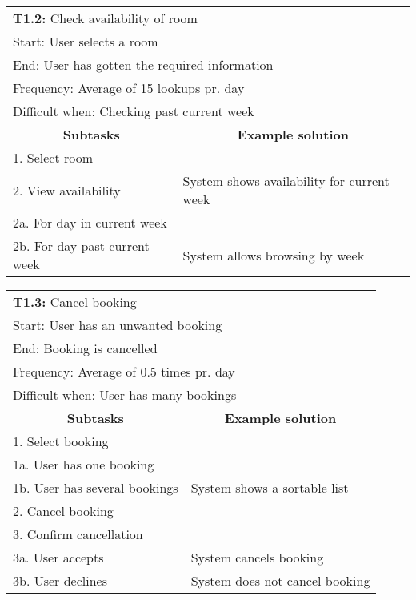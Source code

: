 \begin{tabular}{|p{6cm}|p{6cm}|}
\hline 
	\multicolumn{2}{|l|}{\textbf{T1.2:} \hspace{26mm}Check availability of room} \\
	\multicolumn{2}{|l|}{Start: \hspace{26mm}User selects a room } \\
	\multicolumn{2}{|l|}{End: \hspace{28mm}User has gotten the required information } \\
	\multicolumn{2}{|l|}{Frequency: \hspace{17mm}Average of 15 lookups pr. day} \\
	\multicolumn{2}{|l|}{Difficult when: \hspace{10mm}Checking past current week } \\ \hline
	\multicolumn{1}{|c|}{\textbf{Subtasks}} & \multicolumn{1}{c|}{\textbf{Example solution}} \\ \hline
	1.  Select room & \\ \hline
	2.  View availability & System shows availability for current week\\
	2a. For day in current week & \\
	2b. For day past current week & System allows browsing by week \\ \hline
\end{tabular}
\newline
\vspace{1cm}
\newline
\begin{tabular}{|p{6cm}|p{6cm}|}
\hline 
	\multicolumn{2}{|l|}{\textbf{T1.3:} \hspace{26mm}Cancel booking} \\
	\multicolumn{2}{|l|}{Start: \hspace{26mm}User has an unwanted booking } \\
	\multicolumn{2}{|l|}{End: \hspace{28mm}Booking is cancelled } \\
	\multicolumn{2}{|l|}{Frequency: \hspace{17mm}Average of 0.5 times pr. day} \\
	\multicolumn{2}{|l|}{Difficult when: \hspace{10mm}User has many bookings } \\ \hline
	\multicolumn{1}{|c|}{\textbf{Subtasks}} & \multicolumn{1}{c|}{\textbf{Example solution}} \\ \hline
	1.  Select booking & \\
	1a. User has one booking & \\
	1b. User has several bookings & System shows a sortable list \\ \hline
	2.  Cancel booking & \\ \hline
	3. Confirm cancellation & \\
	3a. User accepts & System cancels booking \\
	3b. User declines & System does not cancel booking \\ \hline
\end{tabular}
